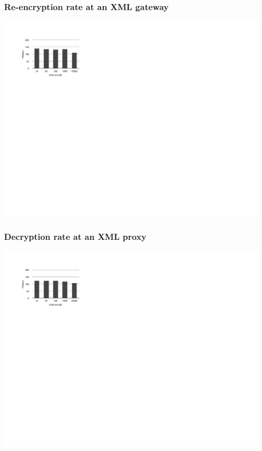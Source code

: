 \documentclass{beamer}
\begin{document}
\begin{frame}
\frametitle{Re-encryption rate at an XML gateway}
\begin{center}
\includegraphics{server_encrypt} \\
\end{center}
\end{frame}

\begin{frame}
\frametitle{Decryption rate at an XML proxy}
\begin{center}
\includegraphics{server_decrypt} \\
\end{center}
\end{frame}
\end{document}

